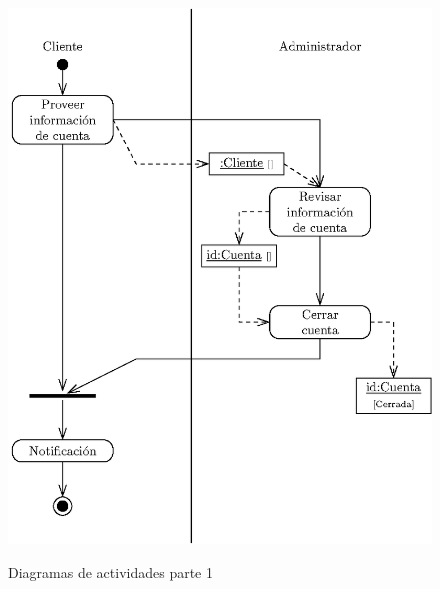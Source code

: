 \begin{figure}[hpt!]
\begin{center}
{    		\includegraphics[scale=0.5]{Imagenes/diag_activity_closeAccount_esp.eps}}
 	\caption{Diagramas de actividades parte 1}
 \end{center}
\end{figure}

